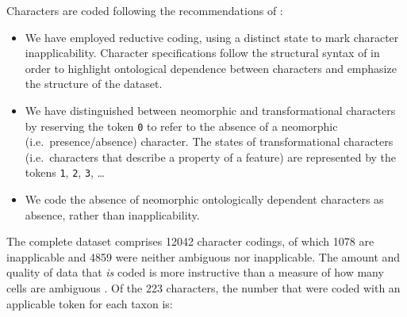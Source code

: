 \documentclass[openany]{book}
\theoremstyle{definition}
\theoremstyle{definition}
\theoremstyle{definition}
\theoremstyle{remark}
\begin{document}
Characters are coded following the recommendations of
\citet{Brazeau2018}:

\begin{itemize}
\item
  We have employed reductive coding, using a distinct state to mark
  character inapplicability. Character specifications follow the
  structural syntax of \citet{Sereno2007} in order to highlight
  ontological dependence between characters and emphasize the structure
  of the dataset.
\item
  We have distinguished between neomorphic and transformational
  characters \citep[sensu][]{Sereno2007} by reserving the token
  \texttt{0} to refer to the absence of a neomorphic
  (i.e.~presence/absence) character. The states of transformational
  characters (i.e.~characters that describe a property of a feature) are
  represented by the tokens \texttt{1}, \texttt{2}, \texttt{3}, \ldots{}
\item
  We code the absence of neomorphic ontologically dependent characters
  \citep[sensu][]{Vogt2017} as absence, rather than inapplicability.
\end{itemize}

The complete dataset comprises 12042 character codings, of which 1078
are inapplicable and 4859 were neither ambiguous nor inapplicable. The
amount and quality of data that \emph{is} coded is more instructive than
a measure of how many cells are ambiguous \citep{Wiens1998, Wiens2003}.
Of the 223 characters, the number that were coded with an applicable
token for each taxon is:
\end{document}
